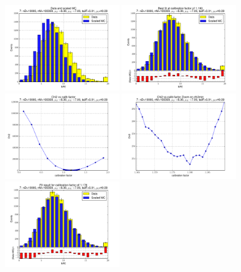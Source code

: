 
 \begin{figure}[htbp] \begin{center} 
\includegraphics[width=0.45\textwidth]{../FIGURES/07/FIG_Data_and_scaled_MC.pdf} 
\includegraphics[width=0.45\textwidth]{../FIGURES/07/FIG_Best_fit_at_calibration_factor_of_1_180.pdf} 
\includegraphics[width=0.45\textwidth]{../FIGURES/07/FIG_Chi2_vs_calib_factor.pdf} 
\includegraphics[width=0.45\textwidth]{../FIGURES/07/FIG_Chi2_vs_calib_factor_Zoom_on_chi2min.pdf} 
\includegraphics[width=0.45\textwidth]{../FIGURES/07/FIG_Fit_result_for_calibration_factor_of_1_176.pdf} 

\end{center}
\end{figure}

